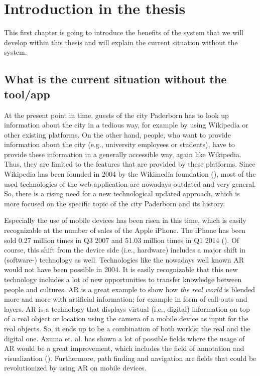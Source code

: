 \chapter[Introduction into the thesis]{Introduction in the thesis}
This first chapter is going to introduce the benefits of the system that we will develop within this thesis and will explain the current situation without the system.

\section{What is the current situation without the tool/app}
At the present point in time, guests of the city Paderborn has to look up information about the city in a tedious way, for example by using Wikipedia or other existing platforms. On the other hand, people, who want to provide information about the city (e.g., university employees or students), have to provide these information in a generally accessible way, again like Wikipedia. Thus, they are limited to the features that are provided by these platforms. Since Wikipedia has been founded in 2004 by the Wikimedia foundation (\cite{wikimedia}), most of the used technologies of the web application are nowadays outdated and very general. So, there is a rising need for a new technological updated approach, which is more focused on the specific topic of the city Paderborn and its history. 

Especially the use of mobile devices has been risen in this time, which is easily recognizable at the number of sales of the Apple iPhone. The iPhone has been sold 0.27 million times in Q3 2007 and 51.03 million times in Q1 2014 (\cite{statIPhone}). Of course, this shift from the device side (i.e., hardware) includes a major shift in (software-) technology as well. Technologies like the nowadays well known \ac{AR} would not have been possible in 2004. It is easily recognizable that this new technology includes a lot of new opportunities to transfer knowledge between people and cultures. \ac{AR} is a great example to show how \emph{the real world} is blended more and more with artificial information; for example in form of call-outs and layers. \ac{AR} is a technology that displays virtual (i.e., digital) information on top of a real object or location using the camera of a mobile device as input for the real objects. So, it ends up to be a combination of both worlds; the real and the digital one. Azuma et. al. has shown a lot of possible fields where the usage of \ac{AR} would be a great improvement, which includes the field of annotation and visualization (\cite{Azu97}). Furthermore, path finding and navigation are fields that could be revolutionized by using \ac{AR} on mobile devices.

